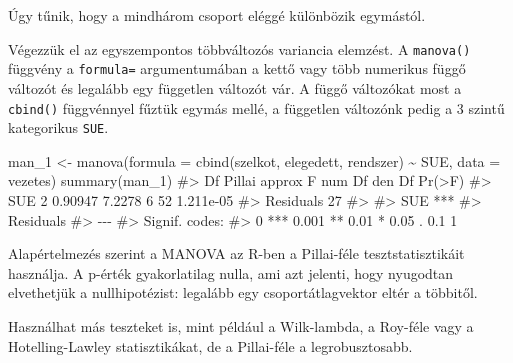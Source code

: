 \documentclass[
  letterpaper,
]{krantz}
\makeatletter
\newenvironment{Shaded}{\begin{snugshade}}{\end{snugshade}}
\newcommand{\AttributeTok}[1]{\textcolor[rgb]{0.40,0.45,0.13}{#1}}
\newcommand{\CommentTok}[1]{\textcolor[rgb]{0.37,0.37,0.37}{#1}}
\newcommand{\FunctionTok}[1]{\textcolor[rgb]{0.28,0.35,0.67}{#1}}
\newcommand{\NormalTok}[1]{\textcolor[rgb]{0.00,0.23,0.31}{#1}}
\newcommand{\OtherTok}[1]{\textcolor[rgb]{0.00,0.23,0.31}{#1}}
\newcommand{\SpecialCharTok}[1]{\textcolor[rgb]{0.37,0.37,0.37}{#1}}
\newenvironment{kframe}{%
\medskip{}
\setlength{\fboxsep}{.8em}
 \def\at@end@of@kframe{}%
 \ifinner\ifhmode%
  \def\at@end@of@kframe{\end{minipage}}%
  \begin{minipage}{\columnwidth}%
 \fi\fi%
 \def\FrameCommand##1{\hskip\@totalleftmargin \hskip-\fboxsep
 \colorbox{shadecolor}{##1}\hskip-\fboxsep
     \hskip-\linewidth \hskip-\@totalleftmargin \hskip\columnwidth}%
 \MakeFramed {\advance\hsize-\width
   \@totalleftmargin\z@ \linewidth\hsize
   \@setminipage}}%
 {\par\unskip\endMakeFramed%
 \at@end@of@kframe}
\renewenvironment{Shaded}{\begin{kframe}}{\end{kframe}}
\makeatother
\begin{document}
Úgy tűnik, hogy a mindhárom csoport eléggé különbözik egymástól.

Végezzük el az egyszempontos többváltozós variancia elemzést. A
\texttt{manova()} függvény a \texttt{formula=} argumentumában a kettő
vagy több numerikus függő változót és legalább egy független változót
vár. A függő változókat most a \texttt{cbind()} függvénnyel fűztük
egymás mellé, a független változónk pedig a 3 szintű kategorikus
\texttt{SUE}.

\begin{Shaded}
\begin{Highlighting}[]
\NormalTok{man\_1 }\OtherTok{\textless{}{-}} \FunctionTok{manova}\NormalTok{(}\AttributeTok{formula =} \FunctionTok{cbind}\NormalTok{(szelkot, elegedett, rendszer) }\SpecialCharTok{\textasciitilde{}}
\NormalTok{    SUE, }\AttributeTok{data =}\NormalTok{ vezetes)}
\FunctionTok{summary}\NormalTok{(man\_1)}
\CommentTok{\#\textgreater{}           Df  Pillai approx F num Df den Df    Pr(\textgreater{}F)}
\CommentTok{\#\textgreater{} SUE        2 0.90947   7.2278      6     52 1.211e{-}05}
\CommentTok{\#\textgreater{} Residuals 27                                         }
\CommentTok{\#\textgreater{}              }
\CommentTok{\#\textgreater{} SUE       ***}
\CommentTok{\#\textgreater{} Residuals    }
\CommentTok{\#\textgreater{} {-}{-}{-}}
\CommentTok{\#\textgreater{} Signif. codes:  }
\CommentTok{\#\textgreater{} 0 \textquotesingle{}***\textquotesingle{} 0.001 \textquotesingle{}**\textquotesingle{} 0.01 \textquotesingle{}*\textquotesingle{} 0.05 \textquotesingle{}.\textquotesingle{} 0.1 \textquotesingle{} \textquotesingle{} 1}
\end{Highlighting}
\end{Shaded}

Alapértelmezés szerint a MANOVA az R-ben a Pillai-féle
tesztstatisztikáit használja. A p-érték gyakorlatilag nulla, ami azt
jelenti, hogy nyugodtan elvethetjük a nullhipotézist: legalább egy
csoportátlagvektor eltér a többitől.

Használhat más teszteket is, mint például a Wilk-lambda, a Roy-féle vagy
a Hotelling-Lawley statisztikákat, de a Pillai-féle a legrobusztosabb.
\end{document}
